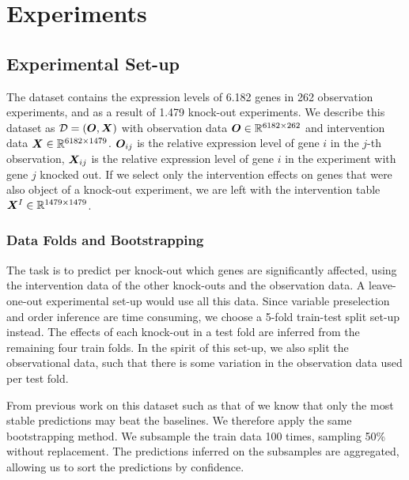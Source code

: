 \newpage
\section{Experiments}
\label{chapter:experiments}


\subsection{Experimental Set-up}

The \citet{kemmeren2014large} dataset contains the expression levels of 6.182 genes in 262 observation experiments, and as a result of 1.479 knock-out experiments. We describe this dataset as $\mathcal{D}=(\bm{O}, \bm{X})$ with observation data $\bm{O} \in \mathbb{R}^{6182\times 262}$ and intervention data $\bm{X} \in \mathbb{R}^{6182\times 1479}$. $\bm{O}_{ij}$ is the relative expression level of gene $i$ in the $j$-th observation, $\bm{X}_{ij}$ is the relative expression level of gene $i$ in the experiment with gene $j$ knocked out. If we select only the intervention effects on genes that were also object of a knock-out experiment, we are left with the intervention table $\bm{X}^I \in \mathbb{R}^{1479\times 1479}$.

\subsubsection{Data Folds and Bootstrapping}

The task is to predict per knock-out which genes are significantly affected, using the intervention data of the other knock-outs and the observation data. A leave-one-out experimental set-up would use all this data. Since variable preselection and order inference are time consuming, we choose a 5-fold train-test split set-up instead. The effects of each knock-out in a test fold are inferred from the remaining four train folds. In the spirit of this set-up, we also split the observational data, such that there is some variation in the observation data used per test fold.

From previous work on this dataset such as that of \citet{versteeg2019boosting} we know that only the most stable predictions may beat the baselines. We therefore apply the same bootstrapping method. We subsample the train data 100 times,  sampling 50\% without replacement. The predictions inferred on the subsamples are aggregated, allowing us to sort the predictions by confidence. 

